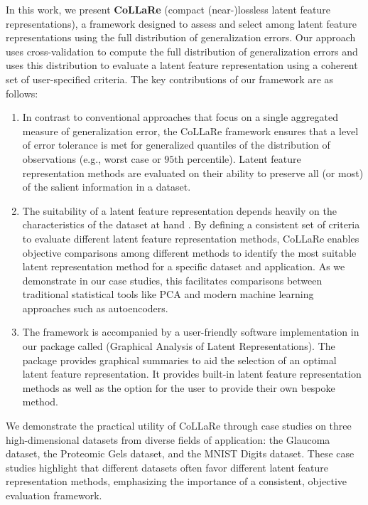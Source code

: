 In this work, we present \textbf{CoLLaRe} (compact (near-)lossless latent feature representations), a framework designed to assess and select among latent feature representations using the full distribution of generalization errors.
Our approach uses cross-validation to compute the full distribution of generalization errors and uses this distribution to evaluate a latent feature representation using a coherent set of user-specified criteria.
The key contributions of our framework are as follows:
\begin{enumerate}
    \item In contrast to conventional approaches that focus on a single aggregated measure of generalization error, the CoLLaRe framework ensures that a level of error tolerance is met for generalized quantiles of the distribution of observations (e.g., worst case or $95$th percentile). Latent feature representation methods are evaluated on their ability to preserve all (or most) of the salient information in a dataset.
    \item The suitability of a latent feature representation depends heavily on the characteristics of the dataset at hand \parencite[Section 3, pp. 325--328]{morris_functional_2015}.
    By defining a consistent set of criteria to evaluate different latent feature representation methods, CoLLaRe enables objective comparisons among different methods to identify the most suitable latent representation method for a specific dataset and application.
    As we demonstrate in our case studies, this facilitates comparisons between traditional statistical tools like PCA and modern machine learning approaches such as autoencoders.
    \item The framework is accompanied by a user-friendly software implementation in our  package called  (Graphical Analysis of Latent Representations).
    The package provides graphical summaries to aid the selection of an optimal latent feature representation.
    It provides built-in latent feature representation methods as well as the option for the user to provide their own bespoke method.
\end{enumerate}
We demonstrate the practical utility of CoLLaRe through case studies on three high-dimensional datasets from diverse fields of application: the Glaucoma dataset, the Proteomic Gels dataset, and the MNIST Digits dataset.
These case studies highlight that different datasets often favor different latent feature representation methods, emphasizing the importance of a consistent, objective evaluation framework.


